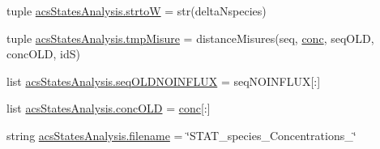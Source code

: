 \begin{DoxyCompactItemize}
tuple \hyperlink{a00104_abe05028c33fab522e3b940195eaaa586}{acs\-States\-Analysis.\-strto\-W} = str(delta\-Nspecies)
\item 
tuple \hyperlink{a00104_a45529ce20ca353ca8ac251b4e88c91ff}{acs\-States\-Analysis.\-tmp\-Misure} = distance\-Misures(seq, \hyperlink{a00027_a941dee33725f074478fdcbf15e1c35ae}{conc}, seq\-O\-L\-D, conc\-O\-L\-D, id\-S)
\item 
list \hyperlink{a00104_ac796dfff897c2b81d04e71e4f3306d16}{acs\-States\-Analysis.\-seq\-O\-L\-D\-N\-O\-I\-N\-F\-L\-U\-X} = seq\-N\-O\-I\-N\-F\-L\-U\-X\mbox{[}\-:\mbox{]}
\item 
list \hyperlink{a00104_a15f99c617a2dc95e52f741ee99e71b7a}{acs\-States\-Analysis.\-conc\-O\-L\-D} = \hyperlink{a00027_a941dee33725f074478fdcbf15e1c35ae}{conc}\mbox{[}\-:\mbox{]}
\item 
string \hyperlink{a00104_a69b59a10e5dc62a6e0d5325e9a27e5c6}{acs\-States\-Analysis.\-filename} = \char`\"{}S\-T\-A\-T\-\_\-species\-\_\-\-Concentrations\-\_\-\char`\"{}
\end{DoxyCompactItemize}
